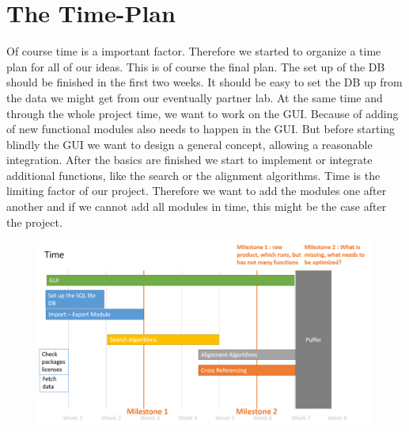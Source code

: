 \documentclass[]{article}
\begin{document}
\section{ The Time-Plan}
Of course time is a important factor. Therefore we started to organize a time plan for all of our ideas. This is of course the final plan. The set up of the DB should be finished in the first two weeks. It should be easy to set the DB up from the data we might get from our eventually partner lab. At the same time and through the whole project time, we want to work on the GUI. Because of adding of new functional modules also needs to happen in the GUI. But before starting blindly the GUI we want to design a general concept, allowing a reasonable integration. After the basics are finished we start to implement or integrate additional functions, like the search or the alignment algorithms. Time is the limiting factor of our project. Therefore we want to add the modules one after another and if we cannot add all modules in time, this might be the case after the project.
  
	\begin{figure}[h]
		\includegraphics[width=\textwidth]{img/Time.png}
	\end{figure}
\end{document}
